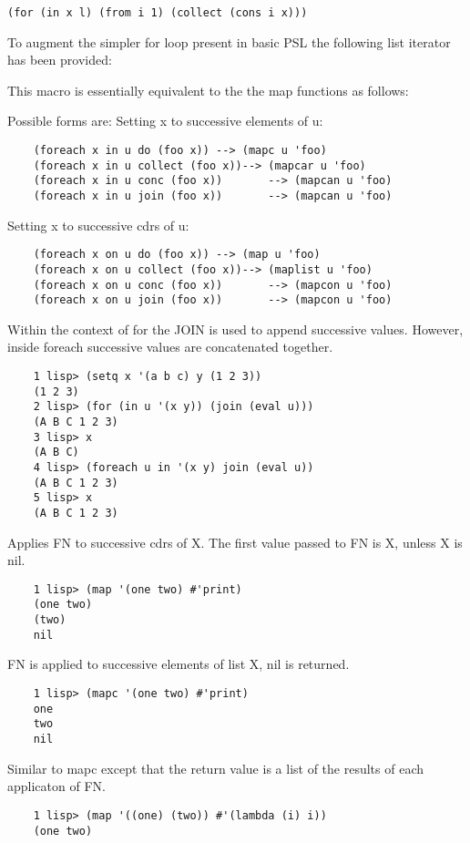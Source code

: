 \begin{verbatim}
(for (in x l) (from i 1) (collect (cons i x)))
\end{verbatim}
  To augment the simpler for  loop  present  in  basic  PSL  the
following list iterator has been provided:


{    This   macro  is  essentially  equivalent  to  the  the  map
    functions as follows:
}

    Possible forms are:
    Setting x to successive elements of u:
\begin{verbatim}
    (foreach x in u do (foo x)) --> (mapc u 'foo)
    (foreach x in u collect (foo x))--> (mapcar u 'foo)
    (foreach x in u conc (foo x))       --> (mapcan u 'foo)
    (foreach x in u join (foo x))       --> (mapcan u 'foo)
\end{verbatim}
    Setting x to successive cdrs of u:
\begin{verbatim}
    (foreach x on u do (foo x)) --> (map u 'foo)
    (foreach x on u collect (foo x))--> (maplist u 'foo)
    (foreach x on u conc (foo x))       --> (mapcon u 'foo)
    (foreach x on u join (foo x))       --> (mapcon u 'foo)
\end{verbatim}
    Within the context of for the JOIN is used to append successive values.
    However, inside foreach successive values are concatenated together.

\begin{verbatim}
    1 lisp> (setq x '(a b c) y (1 2 3))
    (1 2 3)
    2 lisp> (for (in u '(x y)) (join (eval u)))
    (A B C 1 2 3)
    3 lisp> x
    (A B C)
    4 lisp> (foreach u in '(x y) join (eval u))
    (A B C 1 2 3)
    5 lisp> x
    (A B C 1 2 3)
\end{verbatim}

{    Applies FN to successive  cdrs of X.  The first value passed
    to FN is X, unless X is nil.
}
\begin{verbatim}
    1 lisp> (map '(one two) #'print)
    (one two)
    (two)
    nil
\end{verbatim}

{    FN is applied to successive  elements  of  list  X,  nil  is
    returned.
}
\begin{verbatim}
    1 lisp> (mapc '(one two) #'print)
    one
    two
    nil
\end{verbatim}

{    Similar  to  mapc  except that the return value is a list of
    the results of each applicaton of FN.
}
\begin{verbatim}
    1 lisp> (map '((one) (two)) #'(lambda (i) i))
    (one two)
\end{verbatim}


